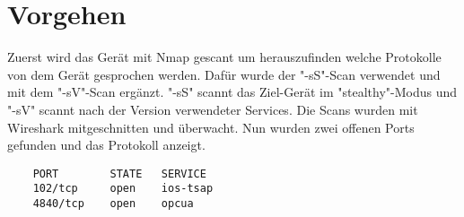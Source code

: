 \cite{RUB}
\cite{beuth}



\section{Vorgehen}
\label{sec:figs}
Zuerst wird das Gerät mit Nmap gescant um herauszufinden welche Protokolle von dem Gerät gesprochen werden.
Dafür wurde der "-sS"-Scan verwendet und mit dem "-sV"-Scan ergänzt.
"-sS" scannt das Ziel-Gerät im "stealthy"-Modus und "-sV" scannt nach der Version verwendeter Services.
Die Scans wurden mit Wireshark mitgeschnitten und überwacht. Nun wurden zwei offenen Ports gefunden und das Protokoll anzeigt.

\begin{verbatim}
	PORT 		STATE 	SERVICE
	102/tcp 	open	ios-tsap
	4840/tcp 	open	opcua
\end{verbatim}






